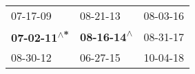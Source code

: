 \begin{supertabular}{lll}
                   07-17-09\textsuperscript{} &                   08-21-13\textsuperscript{} &  08-03-16\textsuperscript{} \\
 \textbf{07-02-11\textsuperscript{$\wedge$*}} &  \textbf{08-16-14\textsuperscript{$\wedge$}} &  08-31-17\textsuperscript{} \\
                   08-30-12\textsuperscript{} &                   06-27-15\textsuperscript{} &  10-04-18\textsuperscript{} \\
\end{supertabular}
